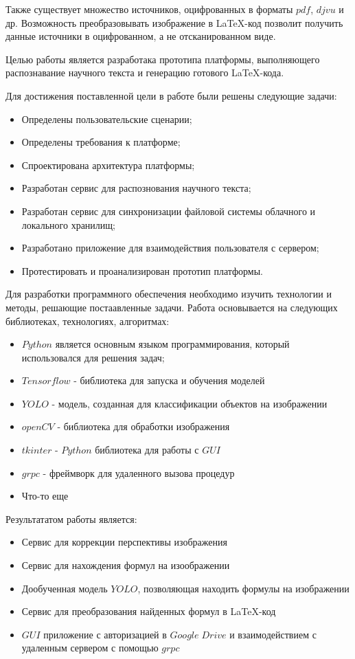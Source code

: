 Также существует множество источников, оцифрованных в форматы $pdf$, $djvu$ и др. Возможность преобразовывать изображение в \LaTeX-код позволит получить данные источники в оцифрованном, а не отсканированном виде.

Целью работы является разработака прототипа платформы, выполняющего распознавание научного текста и  генерацию готового \LaTeX-кода.

Для достижения поставленной цели в работе были решены следующие задачи:
\begin{itemize}
    \item Определены пользовательские сценарии;
    \item Определены требования к платформе;
    \item Спроектирована архитектура платформы;
    \item Разработан сервис для распознования научного текста;
    \item Разработан сервис для синхронизации файловой системы облачного и локального хранилищ;
    \item Разработано приложение для взаимодействия пользователя с сервером;
    \item Протестировать и проанализирован прототип платформы.
\end{itemize}

Для разработки программного обеспечения необходимо изучить технологии и методы, решающие постаавленные задачи. Работа основывается на следующих библиотеках, технологиях, алгоритмах:
\begin{itemize}
    \item $Python$ является основным языком программирования, который использовался для решения задач;
    \item $Tensorflow$ - библиотека для запуска и обучения моделей
    \item $YOLO$ - модель, созданная для классификации объектов на изображении
    \item $openCV$ - библиотека для обработки изображения
    \item $tkinter$ - $Python$ библиотека для работы с $GUI$
    \item $grpc$ - фреймворк для удаленного вызова процедур
    \item Что-то еще
\end{itemize}

Результататом работы является:
\begin{itemize}
    \item Сервис для коррекции перспективы изображения
    \item Сервис для нахождения формул на изоображении
    \item Дообученная модель $YOLO$, позволяющая находить формулы на изображении
    \item Сервис для преобразования найденных формул в \LaTeX-код
    \item $GUI$ приложение с авторизацией в $Google\; Drive$ и взаимодействием с удаленным сервером с помощью $grpc$
\end{itemize}